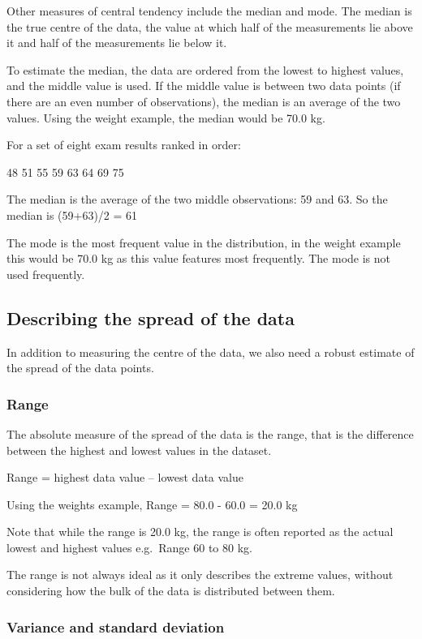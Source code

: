 \documentclass[
]{memoir}
\begin{document}
Other measures of central tendency include the median and mode. The median is the true centre of the data, the value at which half of the measurements lie above it and half of the measurements lie below it.

To estimate the median, the data are ordered from the lowest to highest values, and the middle value is used. If the middle value is between two data points (if there are an even number of observations), the median is an average of the two values.
Using the weight example, the median would be 70.0 kg.

For a set of eight exam results ranked in order:

48 51 55 59 63 64 69 75

The median is the average of the two middle observations: 59 and 63. So the median is (59+63)/2 = 61

The mode is the most frequent value in the distribution, in the weight example this would be 70.0 kg as this value features most frequently. The mode is not used frequently.

\hypertarget{describing-the-spread-of-the-data}{%
\subsection{Describing the spread of the data}\label{describing-the-spread-of-the-data}}

In addition to measuring the centre of the data, we also need a robust estimate of the spread of the data points.

\hypertarget{range}{%
\subsubsection{Range}\label{range}}

The absolute measure of the spread of the data is the range, that is the difference between the highest and lowest values in the dataset.

Range = highest data value -- lowest data value

Using the weights example, Range = 80.0 - 60.0 = 20.0 kg

Note that while the range is 20.0 kg, the range is often reported as the actual lowest and highest values e.g.~Range 60 to 80 kg.

The range is not always ideal as it only describes the extreme values, without considering how the bulk of the data is distributed between them.

\hypertarget{variance-and-standard-deviation}{%
\subsubsection{Variance and standard deviation}\label{variance-and-standard-deviation}}
\end{document}
